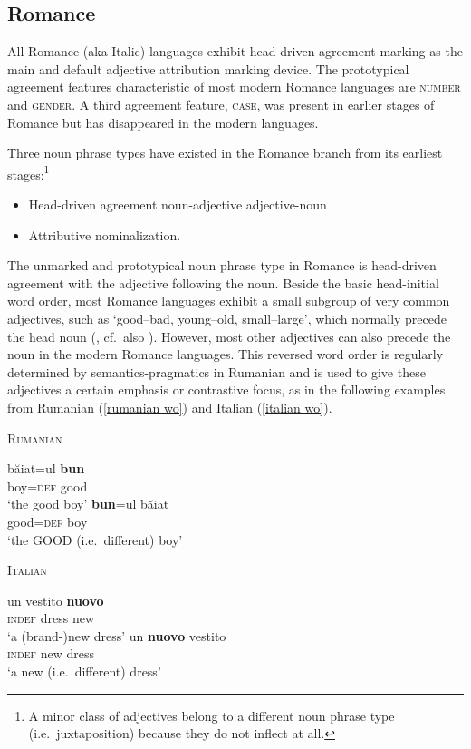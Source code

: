 \subsection{Romance}
All Romance (aka Italic) languages exhibit head-driven agreement marking as the main and default adjective attribution marking device. The prototypical agreement features characteristic of most modern Romance languages are \textsc{number} and \textsc{gender}. A third agreement feature, \textsc{case}, was present in earlier stages of Romance but has disappeared in the modern languages.

Three noun phrase types have existed in the Romance branch from its earliest stages:\footnote{A minor class of adjectives belong to a different noun phrase type (i.e.~juxtaposition) because they do not inflect at all.}
\begin{itemize}
\item{Head-driven agreement}
	\subitem noun-adjective
	\subitem adjective-noun
\item{Attributive nominalization.}
\end{itemize}
The unmarked and prototypical noun phrase type in Romance is head-driven agreement with the adjective following the noun. Beside the basic head-initial word order, most Romance languages exhibit a small subgroup of very common adjectives, such as ‘good–bad, young–old, small–large’, which normally precede the head noun (\citealt[146–147]{posner1996}, cf.~also \citealt[340]{silvestri1998}). However, most other adjectives can also precede the noun in the modern Romance languages. This reversed word order is regularly determined by semantics-pragmatics in Rumanian and is used to give these adjectives a certain emphasis or contrastive focus, as in the following examples from Rumanian (\ref{rumanian wo}) and Italian (\ref{italian wo}).
\begin{exe}
\ex
\begin{xlist} 
\ex \textsc{Rumanian} \citep{beyer-etal1987} \label{rumanian wo} 
\begin{xlist}
\ex	
\gll	băiat=ul \textbf{bun}\\
	boy=\textsc{def} good\\
\glt	‘the good boy’
\ex	
\gll	\textbf{bun}=ul băiat\\
	good=\textsc{def} boy\\
\glt	‘the GOOD (i.e.~different) boy’ 
\end{xlist}
\ex \textsc{Italian} \cite[146]{posner1996} \label{italian wo}
\begin{xlist}
\ex	
\gll	un vestito \textbf{nuovo}\\
	\textsc{indef} dress new\\
\glt	‘a (brand-)new dress’
\ex	
\gll	un \textbf{nuovo} vestito\\
	\textsc{indef} new dress\\
\glt	‘a new (i.e.~different) dress’
\end{xlist}
\end{xlist}
\end{exe}

